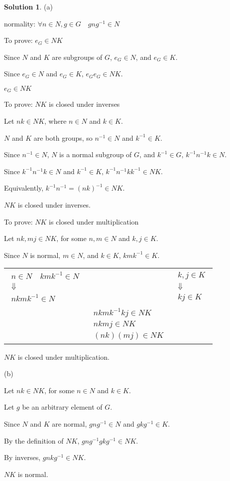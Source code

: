 \documentclass[12pt]{article}
\theoremstyle{definition}
\newtheorem*{soln}{Solution}
\begin{document}
\begin{soln}\quad

(a)

normality: $\forall n\in N,g\in G\quad gng^{-1}\in N$

To prove: $e_G\in NK$

Since $N$ and $K$ are subgroups of $G$, $e_G\in N$, and $e_G\in K$.

Since $e_G\in N$ and $e_G\in K$, $e_Ge_G\in NK$.

$e_G\in NK$

To prove: $NK$ is closed under inverses

Let $nk\in NK$, where $n\in N$ and $k\in K$.

$N$ and $K$ are both groups, so $n^{-1}\in N$ and $k^{-1}\in K$.

Since $n^{-1}\in N$, $N$ is a normal subgroup of $G$, and $k^{-1}\in G$,
$k^{-1}n^{-1}k\in N$.

Since $k^{-1}n^{-1}k\in N$ and $k^{-1}\in K$,
$k^{-1}n^{-1}kk^{-1}\in NK$.

Equivalently, $k^{-1}n^{-1}=(nk)^{-1}\in NK$.

$NK$ is closed under inverses.

To prove: $NK$ is closed under multiplication

Let $nk,mj\in NK$, for some $n,m\in N$ and $k,j\in K$.

Since $N$ is normal, $m\in N$, and $k\in K$, $kmk^{-1}\in K$.

\begin{tabular}{c c c}
$\begin{gathered}
n\in N\quad kmk^{-1}\in N\\
\Downarrow\\
nkmk^{-1}\in N
\end{gathered}$ & &
$\begin{gathered}
k,j\in K\\
\Downarrow\\
kj\in K
\end{gathered}$\\
&
$\begin{gathered}
nkmk^{-1} kj\in NK\\
nkmj\in NK\\
(nk)(mj)\in NK
\end{gathered}$
\end{tabular}

$NK$ is closed under multiplication.

(b)

Let $nk\in NK$, for some $n\in N$ and $k\in K$.

Let $g$ be an arbitrary element of $G$.

Since $N$ and $K$ are normal, $gng^{-1}\in N$ and $gkg^{-1}\in K$.

By the definition of $NK$, $gng^{-1}gkg^{-1}\in NK$.

By inverses, $gnkg^{-1}\in NK$.

$NK$ is normal.

\end{soln}
\end{document}
